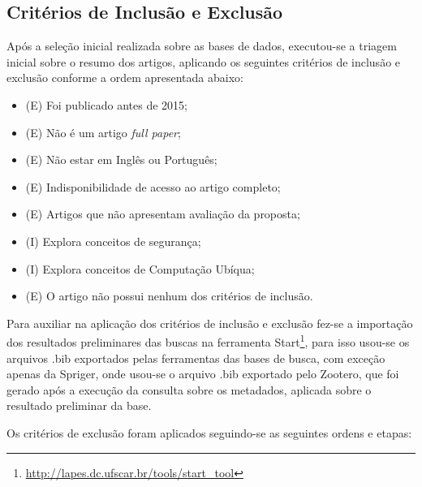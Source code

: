 \documentclass[ti,table]{texufpel} %
\begin{document}
  

\subsection{Critérios de Inclusão e Exclusão} 

Após a seleção inicial realizada sobre as bases de dados, executou-se a triagem inicial sobre o resumo dos artigos, aplicando os seguintes critérios de inclusão e exclusão conforme a ordem apresentada abaixo:  

\begin{itemize} 

    \item (E) Foi publicado antes de 2015; 

    \item (E) Não é um artigo \textit{full paper}; 

    \item (E) Não estar em Inglês ou Português; 

    \item (E) Indisponibilidade de acesso ao artigo completo; 

    \item (E) Artigos que não apresentam avaliação da proposta; 

    \item (I) Explora conceitos de segurança; 

    \item (I) Explora conceitos de Computação Ubíqua; 

    \item (E) O artigo não possui nenhum dos critérios de inclusão. 

\end{itemize} 

  

Para auxiliar na aplicação dos critérios de inclusão e exclusão fez-se a importação dos resultados preliminares das buscas na ferramenta Start\footnote{\url{http://lapes.dc.ufscar.br/tools/start_tool}}, para isso usou-se os arquivos .bib exportados pelas ferramentas das bases de busca, com exceção apenas da Spriger, onde usou-se o arquivo .bib exportado pelo Zootero, que foi gerado após a execução da consulta sobre os metadados, aplicada sobre o resultado preliminar da base. 

  

Os critérios de exclusão foram aplicados seguindo-se as seguintes ordens e etapas: 

  
\end{document}
